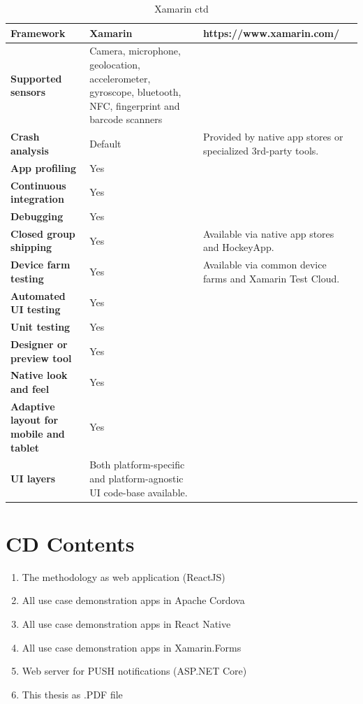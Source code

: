 \documentclass[english,master,public,dept460,male,cpdeclaration,oneside]{diploma}
\begin{document}
\begin{table}[!h]
	\centering
	\caption{Xamarin ctd}
	\begin{tabular}{p{} | p{} | p{}}
		\toprule		
		\textbf{Framework} & \textbf{Xamarin} & https://www.xamarin.com/ \\
		\midrule
		\textbf{Supported sensors} & Camera, microphone, geolocation, accelerometer, gyroscope, bluetooth, NFC, fingerprint and barcode scanners & \\			
		\midrule
		\textbf{Crash analysis} & Default & Provided by native app stores or specialized 3rd-party tools. \\			
		\midrule
		\textbf{App profiling} & Yes & \\			
		\midrule
		\textbf{Continuous integration} & Yes & \\			
		\midrule
		\textbf{Debugging} & Yes & \\			
		\midrule
		\textbf{Closed group shipping} & Yes & Available via native app stores and HockeyApp. \\			
		\midrule
		\textbf{Device farm testing} & Yes & Available via common device farms and Xamarin Test Cloud. \\			
		\midrule
		\textbf{Automated UI testing} & Yes & \\			
		\midrule
		\textbf{Unit testing} & Yes & \\			
		\midrule
		\textbf{Designer or preview tool} & Yes & \\			
		\midrule
		\textbf{Native look and feel} & Yes & \\			
		\midrule
		\textbf{Adaptive layout for mobile and tablet} & Yes & \\			
		\midrule		
		\textbf{UI layers} & Both platform-specific and platform-agnostic UI code-base available. & \\			
		\midrule
	\end{tabular}
\end{table}

\clearpage

\section{CD Contents}

\begin{enumerate}
	\item The methodology as web application (ReactJS)
	\item All use case demonstration apps in Apache Cordova
	\item All use case demonstration apps in React Native
	\item All use case demonstration apps in Xamarin.Forms
	\item Web server for PUSH notifications (ASP.NET Core)
	\item This thesis as .PDF file
\end{enumerate}
\end{document}
